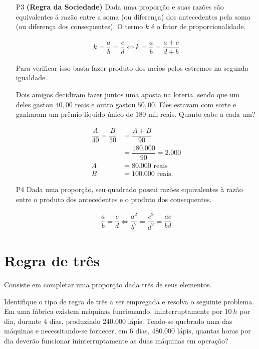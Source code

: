 \begin{enumerate}
\item[P3] \textbf{(Regra da Sociedade)} Dada uma proporção e suas razões são equivalentes á razão entre a soma (ou diferença) dos antecedentes pela soma (ou diferença dos consequentes). O termo $k$ é o fator de proporcionalidade.

\begin{align}
    k=\dfrac{a}{b}=\dfrac{c}{d} \Leftrightarrow k=\dfrac{a}{b}=\dfrac{a+c}{d+b}
\end{align}

Para verificar isso basta fazer produto dos meios pelos estremos na segunda igualdade.

\begin{exe}
Dois amigos decidiram fazer juntos uma aposta na loteria, sendo que um deles gastou $40,00$ reais e outro gastou $50,00$. Eles estavam com sorte e ganharam um prêmio líquido único de $180$ mil reais. Quanto cabe a cada um?
\end{exe}

\begin{align*}
    \dfrac{A}{40}=\dfrac{B}{50}&=\dfrac{A+B}{90}\\
    &=\dfrac{180.000}{90}=2.000\\
    A &=80.000 \mbox{ reais}\\
    B &= 100.000 \mbox{ reais}.
\end{align*}

\item[P4] Dada uma proporção, seu quadrado possui razões equivalentes à razão entre o produto dos antecedentes e o produto dos consequentes.

\begin{align}
\dfrac{a}{b}=\dfrac{c}{d}\Leftrightarrow \dfrac{a^2}{b^2}=\dfrac{c^2}{d^2}=\dfrac{ac}{bd}
\end{align}
\end{enumerate}
\section{Regra de três}
Consiste em completar uma proporção dada três de seus elementos.

\begin{exe}
Identifique o tipo de regra de três a ser empregada e resolva o seguinte problema. Em uma fábrica existem máquinas funcionando, ininterruptamente por $10 \ h$ por dia, durante $4$ dias, produzindo $240.000$ lápis. Tendo-se quebrado uma das máquinas e necessitando-se fornecer, em $6$ dias, $480.000$ lápis, quantas horas por dia deverão funcionar ininterruptamente as duas máquinas em operação?
\end{exe}

